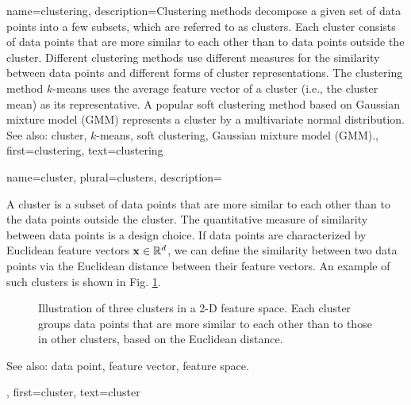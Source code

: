 {
{name={clustering}, 
	description={Clustering methods decompose a given 
		set of data points into a few subsets, which are referred to as clusters. 
		Each cluster consists of data points that are more similar to each 
		other than to data points outside the cluster. Different clustering methods 
		use different measures for the similarity between data points and different 
		forms of cluster representations. The clustering method $k$-means uses the 
		average feature vector of a cluster (i.e., the cluster mean) as its representative. 
		A popular soft clustering method based on Gaussian mixture model (GMM) represents 
		a cluster by a multivariate normal distribution.
				\\
		See also: cluster, $k$-means, soft clustering, Gaussian mixture model (GMM).},
	first={clustering},
	text={clustering} 
}
	
{name={cluster}, plural={clusters}, 
	description={A cluster is a subset of 
		data points that are more similar to each other than to the data points outside the cluster. 
		The quantitative measure of similarity between data points is a design choice. If data points 
		are characterized by Euclidean feature vectors ${\bf x} \in \mathbb{R}^{d}$, 
		we can define the similarity between two data points via the Euclidean distance between 
		their feature vectors. An example of such clusters is shown in Fig. \ref{fig:clusters_dict}.\\
		\begin{figure}[H]
		\centering
		\caption{Illustration of three clusters in a 2-D feature space. Each cluster groups data points 
		that are more similar to each other than to those in other clusters, based on the Euclidean distance.}
		\label{fig:clusters_dict}
		\end{figure}
		See also: data point, feature vector, feature space.},
	first={cluster},
	text={cluster} 
}


}
